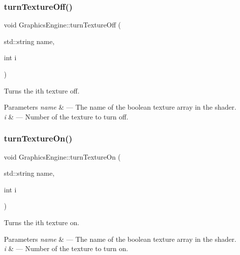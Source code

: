 \subsubsection{\texorpdfstring{turn\+Texture\+Off()}{turnTextureOff()}}
{\footnotesize\ttfamily void Graphics\+Engine\+::turn\+Texture\+Off (\begin{DoxyParamCaption}\item[{std\+::string}]{name,  }\item[{int}]{i }\end{DoxyParamCaption})}



Turns the ith texture off. 


\begin{DoxyParams}{Parameters}
{\em name} & --- The name of the boolean texture array in the shader.\\
\hline
{\em i} & --- Number of the texture to turn off. \\
\hline
\end{DoxyParams}
\mbox{\label{class_graphics_engine_a87f26e8a7fb01b6e317ced365cda1e80}} 
\subsubsection{\texorpdfstring{turn\+Texture\+On()}{turnTextureOn()}}
{\footnotesize\ttfamily void Graphics\+Engine\+::turn\+Texture\+On (\begin{DoxyParamCaption}\item[{std\+::string}]{name,  }\item[{int}]{i }\end{DoxyParamCaption})}



Turns the ith texture on. 


\begin{DoxyParams}{Parameters}
{\em name} & --- The name of the boolean texture array in the shader.\\
\hline
{\em i} & --- Number of the texture to turn on. \\
\hline
\end{DoxyParams}
\mbox{\label{class_graphics_engine_a13a43684e7a53ff0c39b7ef014a8d121}} 
